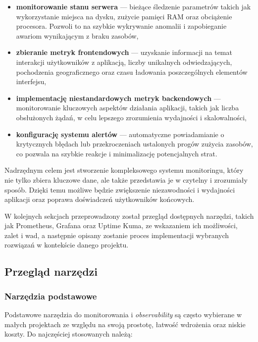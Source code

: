 \documentclass{article}
\begin{document}
\begin{itemize}
    \item \textbf{monitorowanie stanu serwera} — bieżące śledzenie parametrów takich jak wykorzystanie miejsca na dysku, zużycie pamięci RAM oraz obciążenie procesora. Pozwoli to na szybkie wykrywanie anomalii i zapobieganie awariom wynikającym z braku zasobów,
    \item \textbf{zbieranie metryk frontendowych} — uzyskanie informacji na temat interakcji użytkowników z aplikacją, liczby unikalnych odwiedzających, pochodzenia geograficznego oraz czasu ładowania poszczególnych elementów interfejsu,
    \item \textbf{implementację niestandardowych metryk backendowych} — monitorowanie kluczowych aspektów działania aplikacji, takich jak liczba obsłużonych żądań, w celu lepszego zrozumienia wydajności i skalowalności,
    \item \textbf{konfigurację systemu alertów} — automatyczne powiadamianie o krytycznych błędach lub przekroczeniach ustalonych progów zużycia zasobów, co pozwala na szybkie reakcje i minimalizację potencjalnych strat.
\end{itemize}

Nadrzędnym celem jest stworzenie kompleksowego systemu monitoringu, który nie tylko zbiera kluczowe dane, ale także przedstawia je w czytelny i zrozumiały sposób. Dzięki temu możliwe będzie zwiększenie niezawodności i wydajności aplikacji oraz poprawa doświadczeń użytkowników końcowych.

W kolejnych sekcjach przeprowadzony został przegląd dostępnych narzędzi, takich jak Prometheus, Grafana oraz Uptime Kuma, ze wskazaniem ich możliwości, zalet i wad, a następnie opisany zostanie proces implementacji wybranych rozwiązań w kontekście danego projektu.

\subsection{Przegląd narzędzi}

\subsubsection{Narzędzia podstawowe}

Podstawowe narzędzia do monitorowania i \textit{observability} są często wybierane w małych projektach ze względu na swoją prostotę, łatwość wdrożenia oraz niskie koszty. Do najczęściej stosowanych należą:
\end{document}

